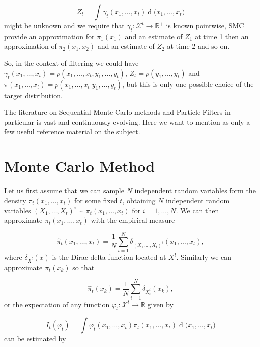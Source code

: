 \documentclass[11pt,a4paper]{article}
\renewcommand{\d}[1]{\ensuremath{\operatorname{d}\!{#1}}}
\begin{document}
\begin{equation*}
    Z_t = \int \gamma_t(x_1, \dots, x_t) \d (x_1, \dots, x_t)
\end{equation*}
might be unknown and we require that $\gamma_t : \mathcal{X}^t \rightarrow \mathbb{R}^+$ is known pointwise, SMC provide an approximation for $\pi_1(x_1)$ and an estimate of $Z_1$ at time 1 then an approximation of $\pi_2(x_1, x_2)$ and an estimate of $Z_2$ at time 2 and so on.

So, in the context of filtering we could have $\gamma_t(x_1, \dots, x_t) = p(x_1, \dots, x_t, y_1, \dots, y_t)$, $Z_t = p(y_1, \dots, y_t)$ and $\pi(x_1, \dots, x_t) = p(x_1, \dots, x_t | y_1, \dots, y_t)$, but this is only one possible choice of the target distribution.

The literature on Sequential Monte Carlo methods and Particle Filters in particular is vast and continuously evolving. Here we want to mention \cite{} as only a few useful reference material on the subject.

\section{Monte Carlo Method}

Let us first assume that we can sample $N$ independent random variables form the density $\pi_t(x_1, \dots, x_t)$ for some fixed $t$, obtaining $N$ independent random variables $(X_1, \dots, X_t)^i \sim \pi_t(x_1, \dots, x_t)$ for $i = 1, \dots, N$. We can then approximate $\pi_t(x_1, \dots, x_t)$ with the empirical measure

\begin{equation*}
    \hat{\pi}_t(x_1, \dots, x_t) = \frac{1}{N} \sum_{i=1}^N \delta_{(X_1, \dots, X_t)^i}(x_1, \dots, x_t),
\end{equation*}
where $\delta_{X^l}(x)$ is the Dirac delta function located at $X^l$. Similarly we can approximate $\pi_t(x_k)$ so that

\begin{equation*}
    \hat{\pi}_t(x_k) = \frac{1}{N} \sum_{i=1}^N \delta_{X_t^i}(x_k),
\end{equation*}
or the expectation of any function $\varphi_t : \mathcal{X}^t \rightarrow \mathbb{R}$ given by

\begin{equation*}
    I_t(\varphi_t) = \int \varphi_t (x_1, \dots, x_t) \pi_t (x_1, \dots, x_t) \d (x_1, \dots, x_t)
\end{equation*}
can be estimated by
\end{document}
